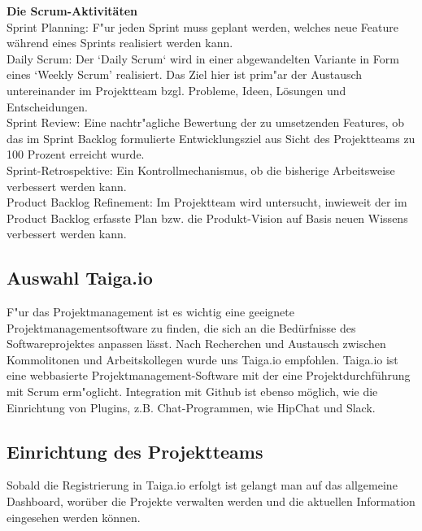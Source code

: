\documentclass[a4paper, 11pt]{scrreprt}
\begin{document}
\textbf{Die Scrum-Aktivitäten}\\

Sprint Planning: F"ur jeden Sprint muss geplant werden, welches neue Feature während eines Sprints realisiert werden kann.\\

Daily Scrum: Der ‘Daily Scrum‘ wird in einer abgewandelten Variante in Form eines ‘Weekly Scrum’ realisiert. Das Ziel hier ist prim"ar der Austausch untereinander im Projektteam bzgl. Probleme, Ideen, Lösungen und Entscheidungen.\\

Sprint Review: Eine nachtr"agliche Bewertung der zu umsetzenden Features, ob  das im Sprint Backlog formulierte Entwicklungsziel aus Sicht des Projektteams zu 100 Prozent erreicht wurde.\\

Sprint-Retrospektive: Ein Kontrollmechanismus, ob die bisherige Arbeitsweise verbessert werden kann.\\

Product Backlog Refinement: Im Projektteam wird untersucht, inwieweit der im Product Backlog erfasste Plan bzw. die Produkt-Vision auf Basis neuen Wissens verbessert werden kann.


\subsection{Auswahl Taiga.io}

F"ur das Projektmanagement ist es wichtig eine geeignete Projektmanagementsoftware zu finden, die sich an die Bedürfnisse
des Softwareprojektes anpassen lässt. Nach Recherchen und Austausch zwischen Kommolitonen und Arbeitskollegen wurde uns Taiga.io empfohlen. Taiga.io ist eine webbasierte Projektmanagement-Software mit der eine Projektdurchführung mit Scrum
erm"oglicht. Integration mit Github ist ebenso möglich, wie die Einrichtung von Plugins, z.B. Chat-Programmen, wie HipChat und Slack.

\subsection{Einrichtung des Projektteams}

Sobald die Registrierung in Taiga.io erfolgt ist gelangt man auf das allgemeine Dashboard, worüber die Projekte verwalten werden und die aktuellen Information eingesehen werden können.\newline
\end{document}
